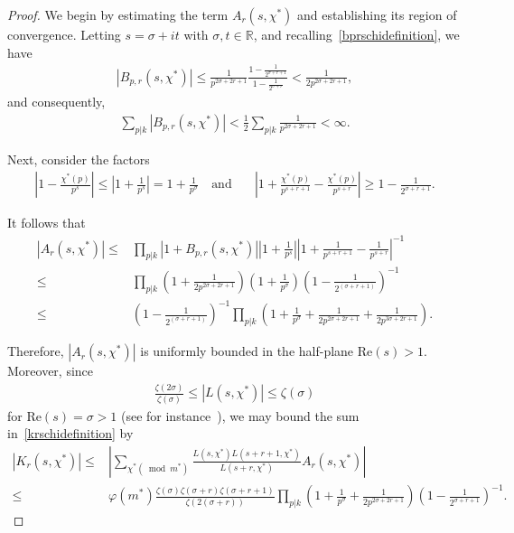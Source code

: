 \documentclass[12pt, oneside,reqno]{amsart}
\numberwithin{equation}{section}
\begin{document}
\begin{proof}
\noindent
We begin by estimating the term $A_r(s,\chi^*)$ and establishing its region of convergence. Letting $s=\sigma+it$ with $\sigma,t\in\mathbb{R}$, and recalling~\eqref{bprschidefinition}, we have
\begin{align*}
|B_{p,r}(s,\chi^*)|
\leq\frac{1}{p^{2\sigma+2r+1}}\frac{1-\frac{1}{2^{\sigma+r+1}}}{1-\frac{1}{2^{\sigma+r}}}
<\frac{1}{2p^{2\sigma+2r+1}},
\end{align*}
and consequently,
\begin{align*}
\sum_{p|k}|B_{p,r}(s,\chi^*)|
<\frac{1}{2}\sum_{p|k}\frac{1}{p^{2\sigma+2r+1}}
<\infty.    
\end{align*}

\noindent
Next, consider the factors
\begin{align*}
\left|1-\frac{\chi^*(p)}{p^{s}}\right|
\leq \left|1+\frac{1}{p^{s}}\right|
=1+\frac{1}{p^{\sigma}}\quad \text{and}\quad &\left|1+\frac{\chi^{*}(p)}{p^{s+r+1}}-\frac{\chi^{*}(p)}{p^{s+r}}\right|
\geq 1-\frac{1}{2^{\sigma+r+1}}.%
\end{align*}

\noindent
It follows that
\begin{align}\label{arskchibound}
|A_r(s,\chi^*)|
\leq&\prod_{p|k}|1+B_{p,r}(s,\chi^*)|\left|1+\frac{1}{p^{s}}\right|\left|1+\frac{1}{p^{s+r+1}}-\frac{1}{p^{s+r}}\right|^{-1}\nonumber\\
\leq&\prod_{p|k}\left(1+\frac{1}{2p^{2\sigma+2r+1}}\right)\left(1+\frac{1}{p^{\sigma}}\right)\left(1-\frac{1}{2^{(\sigma+r+1)}}\right)^{-1}\nonumber\\
\leq&\left(1-\frac{1}{2^{(\sigma+r+1)}}\right)^{-1}\prod_{p|k}\left(1+\frac{1}{p^{\sigma}}+\frac{1}{2p^{2\sigma+2r+1}}+\frac{1}{2p^{3\sigma+2r+1}}\right).
\end{align}

\noindent
Therefore, $|A_r(s,\chi^*)|$ is uniformly bounded in the half-plane $\mathrm{Re}(s)>1$. Moreover, since
\begin{align*}
\frac{\zeta(2\sigma)}{\zeta(\sigma)}
\leq|L(s,\chi^*)|
\leq\zeta(\sigma)    
\end{align*}
for $\mathrm{Re}(s)=\sigma>1$ (see for instance~\cite[Lemma 2.1]{gregmartin}), we may bound the sum in~\eqref{krschidefinition} by
\begin{align*}
|K_r(s,\chi^*)|
\leq&\left|\sum_{\chi^*(\bmod{m^*})}\frac{L(s,\chi^*)L(s+r+1,\chi^*)}{L(s+r,\chi^*)}A_r(s,\chi^*)\right|\\
\leq&\varphi(m^*)\frac{\zeta(\sigma)\zeta(\sigma+r)\zeta(\sigma+r+1)}{\zeta(2(\sigma+r))}\prod_{p|k}\left(1+\frac{1}{p^{\sigma}}+\frac{1}{2p^{2\sigma+2r+1}}\right)\left(1-\frac{1}{2^{\sigma+r+1}}\right)^{-1}.
\end{align*}


\end{proof}
\end{document}
